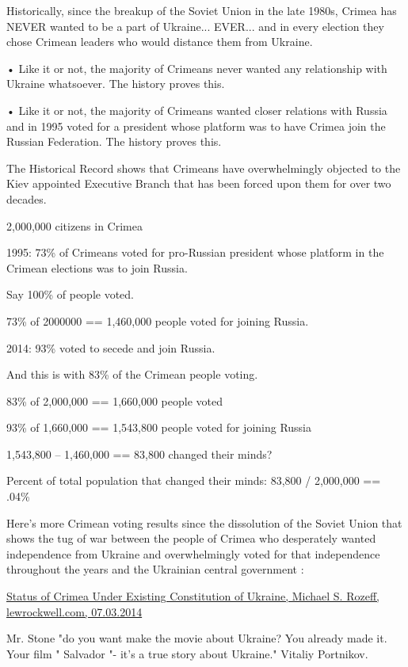 \begin{itemize}
Historically, since the breakup of the Soviet Union in the late 1980s, Crimea
has NEVER wanted to be a part of Ukraine... EVER... and in every election they
chose Crimean leaders who would distance them from Ukraine.

• Like it or not, the majority of Crimeans never wanted any relationship with
Ukraine whatsoever. The history proves this.

• Like it or not, the majority of Crimeans wanted closer relations with Russia
and in 1995 voted for a president whose platform was to have Crimea join the
Russian Federation. The history proves this.

The Historical Record shows that Crimeans have overwhelmingly objected to the
Kiev appointed Executive Branch that has been forced upon them for over two
decades.

2,000,000 citizens in Crimea

1995: 73\% of Crimeans voted for pro-Russian president whose platform in the
Crimean elections was to join Russia.

Say 100\% of people voted.

73\% of 2000000 == 1,460,000 people voted for joining Russia.

2014: 93\% voted to secede and join Russia.

And this is with 83\% of the Crimean people voting.

83\% of 2,000,000 == 1,660,000 people voted

93\% of 1,660,000 == 1,543,800 people voted for joining Russia

1,543,800 – 1,460,000 == 83,800 changed their minds?

Percent of total population that changed their minds: 83,800 / 2,000,000 == .04\%

Here's more Crimean voting results since the dissolution of the Soviet Union
that shows the tug of war between the people of Crimea who desperately wanted
independence from Ukraine and overwhelmingly voted for that independence
throughout the years and the Ukrainian central government :

\href{https://www.lewrockwell.com/lrc-blog/status-of-crimea-under-existing-constitution-of-ukraine/}{%
Status of Crimea Under Existing Constitution of Ukraine, Michael S. Rozeff, lewrockwell.com, 07.03.2014%
}


Mr. Stone "do you want make the movie about Ukraine? You already made it. Your
film " Salvador "- it's a true story about Ukraine." Vitaliy Portnikov.



\end{itemize}
